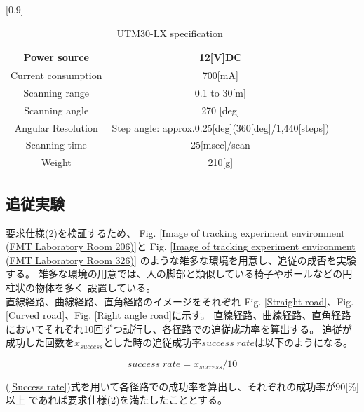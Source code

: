 \begin{table}[h]
  \begin{center}
    \caption{{UTM30-LX specification}\label{UTM30-LX specification}}
    \scalebox{1.0}[0.9]{
      \begin{tabular}{c|c} \hline
        Power source & 12[V]DC \\ \hline
        Current consumption & 700[mA] \\ \hline
        Scanning range & 0.1 to 30[m] \\ \hline
        Scanning angle & 270 [deg] \\ \hline
        Angular Resolution & Step angle: approx.0.25[deg](360[deg]/1,440[steps]) \\ \hline
        Scanning time & 25[msec]/scan \\ \hline
        Weight & 210[g] \\ \hline
      \end{tabular}
    }
  \end{center}
\end{table}

\subsection{追従実験}
要求仕様(2)を検証するため、
Fig. \ref{Image of tracking experiment environment (FMT Laboratory Room 206)}と
Fig. \ref{Image of tracking experiment environment (FMT Laboratory Room 326)}
のような雑多な環境を用意し、追従の成否を実験する。
雑多な環境の用意では、人の脚部と類似している椅子やポールなどの円柱状の物体を多く
設置している。\\ \indent
直線経路、曲線経路、直角経路のイメージをそれぞれ
Fig. \ref{Straight road}、Fig. \ref{Curved road}、Fig. \ref{Right angle road}に示す。
直線経路、曲線経路、直角経路においてそれぞれ10回ずつ試行し、各径路での追従成功率を算出する。
追従が成功した回数を$x_{success}$とした時の追従成功率$success \; rate$は以下のようになる。

\begin{equation}
\label{Success rate}
  success \; rate = x_{success} / 10
\end{equation}

(\ref{Success rate})式を用いて各径路での成功率を算出し、それぞれの成功率が90[\%]以上
であれば要求仕様(2)を満たしたこととする。

